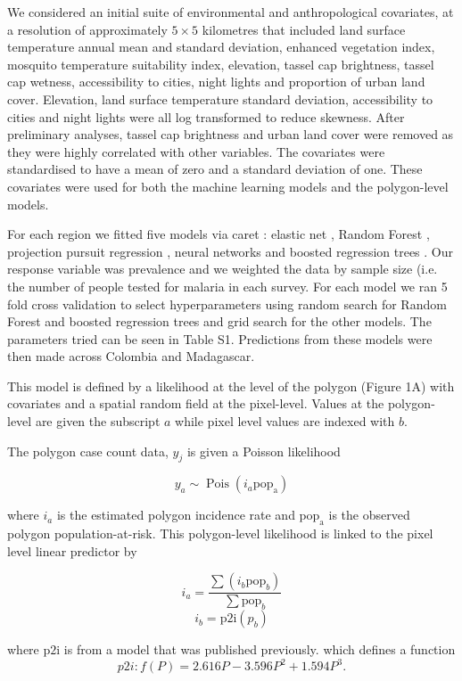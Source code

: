 \documentclass[11pt]{article}
\begin{document}
We considered an initial suite of environmental and anthropological covariates, at a resolution of approximately $5 \times 5$ kilometres that included land surface temperature annual mean and standard deviation, enhanced vegetation index, mosquito temperature suitability index, elevation, tassel cap brightness, tassel cap wetness, accessibility to cities, night lights and proportion of urban land cover. 
Elevation, land surface temperature standard deviation, accessibility to cities and night lights were all log transformed to reduce skewness. 
After preliminary analyses, tassel cap brightness and urban land cover were removed as they were highly correlated with other variables. 
The covariates were standardised to have a mean of zero and a standard deviation of one. 
These covariates were used for both the machine learning models and the polygon-level models.

For each region we fitted five models via caret \cite{caret}: elastic net \cite{enet}, Random Forest \cite{ranger}, projection pursuit regression \cite{PPR}, neural networks \cite{nnet} and boosted regression trees \cite{gbm}.
Our response variable was prevalence and we weighted the data by sample size (i.e. the number of people tested for malaria in each survey.
For each model we ran 5 fold cross validation to select hyperparameters using random search for Random Forest and boosted regression trees and grid search for the other models. 
The parameters tried can be seen in Table S1.
Predictions from these models were then made across Colombia and Madagascar.



This model is defined by a likelihood at the level of the polygon (Figure 1A) with covariates and a spatial random field at the pixel-level. Values at the polygon-level are given the subscript $a$ while pixel level values are indexed with $b$.

The polygon case count data, $y_j$ is given a Poisson likelihood

$$y_a \sim \operatorname{Pois}(i_a\mathrm{pop_a})$$

where $i_a$ is the estimated polygon incidence rate and $\mathrm{pop_a}$ is the observed polygon population-at-risk. This polygon-level likelihood is linked to the pixel level linear predictor by 

$$i_a = \frac{ \sum(i_b \mathrm{pop}_b)}{\sum  \mathrm{pop}_b} $$
$$i_b = \mathrm{p2i}(p_b)$$

where $\mathrm{p2i}$ is from a model that was published previously. \cite{cameron2015defining} which defines a function
$${p2i}: f\left(P\right) = 2.616P - 3.596P^2 + 1.594P^3.$$
\end{document}
